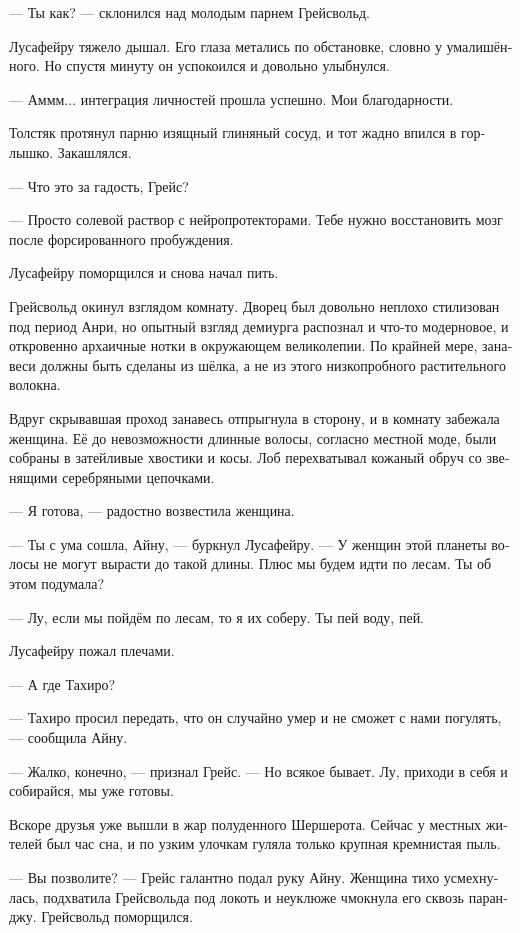 \documentclass[a4paper,12pt,fleqn]{book}\usepackage{polyglossia}\setdefaultlanguage[babelshorthands=true]{russian}\setotherlanguage{english}\defaultfontfeatures{Ligatures=TeX,Mapping=tex-text}\usepackage{xcolor}\newcommand{\ml}[3]{#2}
\newcommand{\asterism}{\vspace{1em}{\centering\Large\bfseries$\ast~\ast~\ast$\par}\vspace{1em}}
\begin{document}
{--- Ты как? --- склонился над молодым парнем Грейсвольд.

Лусафейру тяжело дышал.
Его глаза метались по обстановке, словно у умалишённого. Но спустя минуту он успокоился и довольно улыбнулся.

--- Аммм... интеграция личностей прошла успешно.
Мои благодарности.

Толстяк протянул парню изящный глиняный сосуд, и тот жадно впился в горлышко.
Закашлялся.

--- Что это за гадость, Грейс?

--- Просто солевой раствор с нейропротекторами.
Тебе нужно восстановить мозг после форсированного пробуждения.

Лусафейру поморщился и снова начал пить.

Грейсвольд окинул взглядом комнату.
Дворец был довольно неплохо стилизован под период Анри, но опытный взгляд демиурга распознал и что-то модерновое, и откровенно архаичные нотки в окружающем великолепии.
По крайней мере, занавеси должны быть сделаны из шёлка, а не из этого низкопробного растительного волокна.

Вдруг скрывавшая проход занавесь отпрыгнула в сторону, и в комнату забежала женщина.
Её до невозможности длинные волосы, согласно местной моде, были собраны в затейливые хвостики и косы.
Лоб перехватывал кожаный обруч со звенящими серебряными цепочками.

--- Я готова, --- радостно возвестила женщина.

--- Ты с ума сошла, Айну, --- буркнул Лусафейру.
--- У женщин этой планеты волосы не могут вырасти до такой длины.
Плюс мы будем идти по лесам.
Ты об этом подумала?

--- Лу, если мы пойдём по лесам, то я их соберу.
Ты пей воду, пей.

Лусафейру пожал плечами.

--- А где Тахиро?

--- Тахиро просил передать, что он случайно умер и не сможет с нами погулять, --- сообщила Айну.

--- Жалко, конечно, --- признал Грейс.
--- Но всякое бывает.
Лу, приходи в себя и собирайся, мы уже готовы.

\asterism

Вскоре друзья уже вышли в жар полуденного Шершерота.
Сейчас у местных жителей был час сна, и по узким улочкам гуляла только крупная кремнистая пыль.

--- Вы позволите? --- Грейс галантно подал руку Айну.
Женщина тихо усмехнулась, подхватила Грейсвольда под локоть и неуклюже чмокнула его сквозь паранджу.
Грейсвольд поморщился.

}
\end{document}
